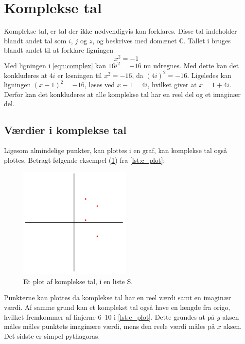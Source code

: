 \section{Komplekse tal}
Komplekse tal, er tal der ikke nødvendigvis kan forklares. 
Disse tal indeholder blandt andet tal som $i$, $j$ og $z$, og beskrives med domænet $\mathbb{C}$.
Tallet i bruges blandt andet til at forklare ligningen
\begin{equation}
    \label{eqn:complex}
    x^2=-1
\end{equation}
Med ligningen i \cref{eqn:complex} kan $16i^2=-16$ nu udregnes. 
Med dette kan det konkluderes at $4i$ er løsningen til $x^2=-16$, da $(4i)^2=-16$.
Ligeledes kan ligningen $(x-1)^2=-16$, løses ved $x-1=4i$, hvilket giver at $x=1+4i$.
Derfor kan det konkluderes at alle komplekse tal har en reel del og et imaginær del.

\subsection{Værdier i komplekse tal}
Ligesom almindelige punkter, kan plottes i en graf, kan komplekse tal også plottes.
Betragt følgende eksempel (\cref{fig:C_plot}) fra \cref{lst:c_plot}:
\begin{figure}[h]
    \centering
    \includegraphics[width=0.5\textwidth]{img/complex_plot.png}
    \caption{Et plot af komplekse tal, i en liste S.}
    \label{fig:C_plot}
\end{figure}

Punkterne kan plottes da komplekse tal har en reel værdi samt en imaginær værdi.
Af samme grund kan et komplekst tal også have en længde fra origo, hvilket fremkommer af linjerne 6--10 i \cref{lst:c_plot}.
Dette grundes at på $y$ aksen måles måles punktets imaginære værdi, mens den reele værdi måles på $x$ aksen.
Det sidste er simpel pythagoras.
